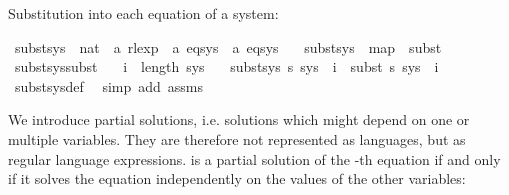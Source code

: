\begin{isabellebody}
\begin{isamarkuptext}%
Substitution into each equation of a system:%
\end{isamarkuptext}\isamarkuptrue%
\isamarkupfalse%
\ subst{\isacharunderscore}{\kern0pt}sys\ {\isacharcolon}{\kern0pt}{\isacharcolon}{\kern0pt}\ {\isachardoublequoteopen}{\isacharparenleft}{\kern0pt}nat\ {\isasymRightarrow}\ {\isacharprime}{\kern0pt}a\ rlexp{\isacharparenright}{\kern0pt}\ {\isasymRightarrow}\ {\isacharprime}{\kern0pt}a\ eq{\isacharunderscore}{\kern0pt}sys\ {\isasymRightarrow}\ {\isacharprime}{\kern0pt}a\ eq{\isacharunderscore}{\kern0pt}sys{\isachardoublequoteclose}\ \isanewline
\ \ {\isachardoublequoteopen}subst{\isacharunderscore}{\kern0pt}sys\ {\isasymequiv}\ map\ {\isasymcirc}\ subst{\isachardoublequoteclose}\isanewline
\isanewline
{}\isamarkupfalse%
\ subst{\isacharunderscore}{\kern0pt}sys{\isacharunderscore}{\kern0pt}subst{\isacharcolon}{\kern0pt}\isanewline
\ \ \ {\isachardoublequoteopen}i\ {\isacharless}{\kern0pt}\ length\ sys{\isachardoublequoteclose}\isanewline
\ \ \ {\isachardoublequoteopen}{\isacharparenleft}{\kern0pt}subst{\isacharunderscore}{\kern0pt}sys\ s\ sys{\isacharparenright}{\kern0pt}\ {\isacharbang}{\kern0pt}\ i\ {\isacharequal}{\kern0pt}\ subst\ s\ {\isacharparenleft}{\kern0pt}sys\ {\isacharbang}{\kern0pt}\ i{\isacharparenright}{\kern0pt}{\isachardoublequoteclose}\isanewline
%
\isadelimproof
\ \ %
\endisadelimproof
%
\isatagproof
{}\isamarkupfalse%
\ subst{\isacharunderscore}{\kern0pt}sys{\isacharunderscore}{\kern0pt}def\ \isamarkupfalse%
\ {\isacharparenleft}{\kern0pt}simp\ add{\isacharcolon}{\kern0pt}\ assms{\isacharparenright}{\kern0pt}%
\endisatagproof
{\isafoldproof}%
%
\isadelimproof
%
\endisadelimproof
%
\isadelimdocument
%
\endisadelimdocument
%
\isatagdocument
%
\isamarkuptrue%
%
\endisatagdocument
{\isafolddocument}%
%
\isadelimdocument
%
\endisadelimdocument
%
\begin{isamarkuptext}%
We introduce partial solutions, i.e. solutions which might depend on one or multiple
variables. They are therefore not represented as languages, but as regular language expressions.
 is a partial solution of the -th equation if and only if it solves the equation
independently on the values of the other variables:%
\end{isamarkuptext}\isamarkuptrue%
\isamarkupfalse%

\end{isabellebody}
